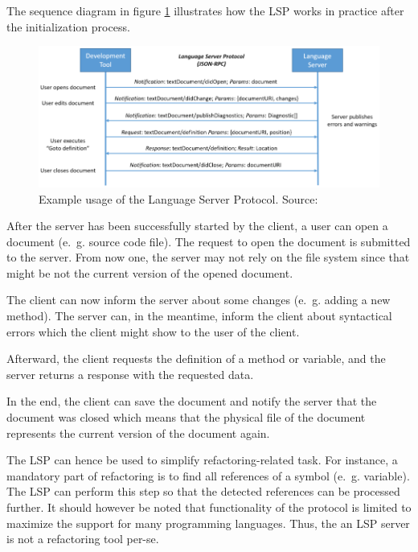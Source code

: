 The sequence diagram in figure \ref{fig:lsp_usage} illustrates how the \ac{LSP} works in practice after the initialization process. 
\begin{figure}
    \centering
    \includegraphics{figures/chapter2/language-server-sequence.png}
    \caption{Example usage of the Language Server Protocol. Source: \cite{lsp_website} }
    \label{fig:lsp_usage}
    
\end{figure}

After the server has been successfully started by the client, a user can open a document (e.~g. source code file). The request to open the document is submitted to the server. From now one, the server may not rely on the file system since that might be not the current version of the opened document. 

The client can now inform the server about some changes (e.~g. adding a new method). The server can, in the meantime, inform the client about syntactical errors which the client might show to the user of the client.

Afterward, the client requests the definition of a method or variable, and the server returns a response with the requested data.

In the end, the client can save the document and notify the server that the document was closed which means that the physical file of the document represents the current version of the document again. 

The \ac{LSP} can hence be used to simplify refactoring-related task. For instance, a mandatory part of refactoring is to find all references of a symbol (e.~g. variable). The \ac{LSP} can perform this step so that the detected references can be processed further. It should however be noted that functionality of the protocol is limited to maximize the support for many programming languages. Thus, the an \ac{LSP} server is not a refactoring tool per-se. 





